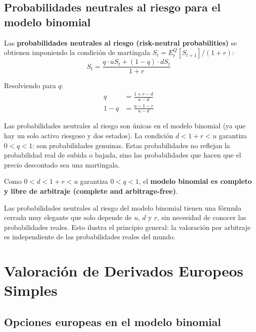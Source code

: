 \documentclass[12pt]{article}
\begin{document}
\subsection{Probabilidades neutrales al riesgo para el modelo binomial}

Las \textbf{probabilidades neutrales al riesgo (risk-neutral probabilities)} se obtienen imponiendo la condici\'on de martingala $S_t = E_t^Q[S_{t+1}]/(1+r)$:
\begin{equation}
    S_t = \frac{q \cdot uS_t + (1-q) \cdot dS_t}{1+r}
\end{equation}

Resolviendo para $q$:
\begin{align}
    q &= \frac{1 + r - d}{u - d} \\
    1 - q &= \frac{u - 1 - r}{u - d}
\end{align}

\begin{intuicionmat}
Las probabilidades neutrales al riesgo son \'unicas en el modelo binomial (ya que hay un solo activo riesgoso y dos estados). La condici\'on $d < 1+r < u$ garantiza $0 < q < 1$: son probabilidades genuinas. Estas probabilidades no reflejan la probabilidad real de subida o bajada, sino las probabilidades que hacen que el precio descontado sea una martingala.
\end{intuicionmat}

Como $0 < d < 1+r < u$ garantiza $0 < q < 1$, el \textbf{modelo binomial es completo y libre de arbitraje (complete and arbitrage-free)}.

\begin{intuicion}
Las probabilidades neutrales al riesgo del modelo binomial tienen una f\'ormula cerrada muy elegante que solo depende de $u$, $d$ y $r$, sin necesidad de conocer las probabilidades reales. Esto ilustra el principio general: la valoraci\'on por arbitraje es independiente de las probabilidades reales del mundo.
\end{intuicion}

\section{Valoraci\'on de Derivados Europeos Simples}

\subsection{Opciones europeas en el modelo binomial}
\end{document}
